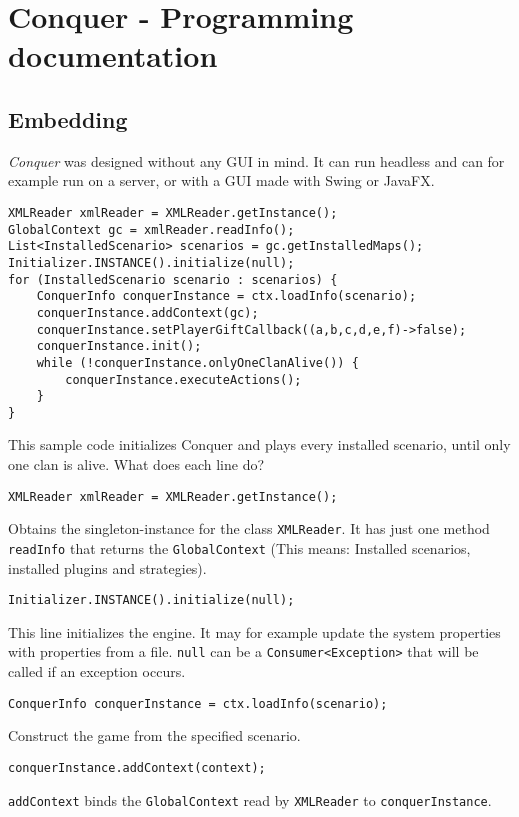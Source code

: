 \documentclass{article}
\begin{document}
\tableofcontents
\newpage
\section{Conquer - Programming documentation}
\subsection{Embedding}
\textit{Conquer} was designed without any GUI in mind. It can run headless and can for example run on a server, or with a GUI made with Swing or JavaFX.
\begin{verbatim}
XMLReader xmlReader = XMLReader.getInstance();
GlobalContext gc = xmlReader.readInfo();
List<InstalledScenario> scenarios = gc.getInstalledMaps();
Initializer.INSTANCE().initialize(null);
for (InstalledScenario scenario : scenarios) {
	ConquerInfo conquerInstance = ctx.loadInfo(scenario);
	conquerInstance.addContext(gc);
	conquerInstance.setPlayerGiftCallback((a,b,c,d,e,f)->false);
	conquerInstance.init();
	while (!conquerInstance.onlyOneClanAlive()) {
		conquerInstance.executeActions();
	}
}
\end{verbatim}
This sample code initializes Conquer and plays every installed scenario, until only one clan is alive.\newline
What does each line do?\newline
\begin{verbatim}
XMLReader xmlReader = XMLReader.getInstance();
\end{verbatim}
Obtains the singleton-instance for the class \texttt{XMLReader}. It has just one method \texttt{readInfo} that returns the \texttt{GlobalContext} (This means: Installed scenarios,
installed plugins and strategies).
\begin{verbatim}
Initializer.INSTANCE().initialize(null);
\end{verbatim}
This line initializes the engine. It may for example update the system properties with properties from a file. \texttt{null} can be a \texttt{Consumer<Exception>} that will be called if an exception 
occurs.
\begin{verbatim}
ConquerInfo conquerInstance = ctx.loadInfo(scenario);
\end{verbatim}
Construct the game from the specified scenario.
\begin{verbatim}
conquerInstance.addContext(context);
\end{verbatim}
\texttt{addContext} binds the \texttt{GlobalContext} read by \texttt{XMLReader} to \texttt{conquerInstance}.
\end{document}
